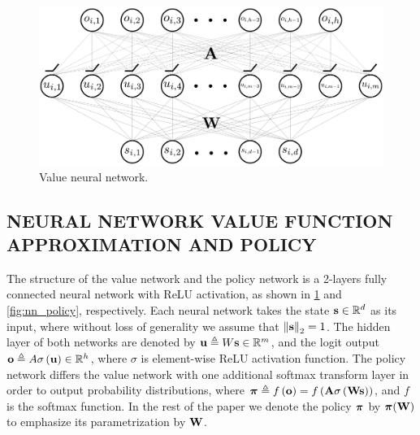 \begin{figure}[t]
	\vskip 0.2in
	\begin{center}
		\centerline{\includegraphics[width=\columnwidth]{nn_value.pdf}}
		\caption{Value neural network.}
		\label{fig:nn_value}
	\end{center}
	\vskip -0.2in
\end{figure}





\subsection{NEURAL NETWORK VALUE FUNCTION APPROXIMATION AND POLICY}
\label{subsec:nn_value_policy}
The structure of the value network and the policy network  is a 2-layers fully connected neural network with ReLU activation, as shown in \cref{fig:nn_value} and \cref{fig:nn_policy}, respectively. 
Each neural network takes the state ${\mathbf{s}} \in {\mathbb{R}}^d$ as its input, where without loss of generality we assume that $\left\| {\mathbf{s}} \right\|_2 = 1$.
The hidden layer of both networks are denoted by ${\mathbf{u}}   \triangleq W{\mathbf{s}}\in{\mathbb{R}}^m$, and the logit output ${\mathbf{o}} \triangleq A\sigma\left( {\mathbf{u}}\right) \in {\mathbb{R}}^h$, where $\sigma$ is element-wise ReLU activation function. 
The policy network differs the value network with one additional softmax transform layer in order to output probability distributions, where ${\boldsymbol{\pi}} \triangleq f\left( {\mathbf{o}} \right) = f\left( {\mathbf{A}} \sigma\left( {\mathbf{W}} {\mathbf{s}} \right) \right)$, and $f$ is the softmax function. In the rest of the paper we denote the policy ${\boldsymbol{\pi}}$ by ${\boldsymbol{\pi}}({\mathbf{W}})$ to emphasize its parametrization by ${\mathbf{W}}$. 

